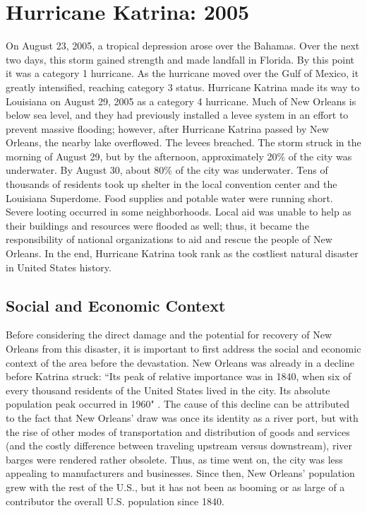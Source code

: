 \documentclass[%
 reprint,
 amsmath,amssymb,
 aps,
]{revtex4-1}
\begin{document}
\section{\label{sec:level1}Hurricane Katrina: 2005}

On August 23, 2005, a tropical depression arose over the Bahamas. Over the next two days, this storm gained strength and made landfall in Florida. By this point it was a category 1 hurricane. As the hurricane moved over the Gulf of Mexico, it greatly intensified, reaching category 3 status. Hurricane Katrina made its way to Louisiana on August 29, 2005 as a category 4 hurricane. Much of New Orleans is below sea level, and they had previously installed a levee system in an effort to prevent massive flooding; however, after Hurricane Katrina passed by New Orleans, the nearby lake overflowed. The levees breached. The storm struck in the morning of August 29, but by the afternoon, approximately 20\% of the city was underwater. By August 30, about 80\% of the city was underwater. Tens of thousands of residents took up shelter in the local convention center and the Louisiana Superdome. Food supplies and potable water were running short. Severe looting occurred in some neighborhoods. Local aid was unable to help as their buildings and resources were flooded as well; thus, it became the responsibility of national organizations to aid and rescue the people of New Orleans. In the end, Hurricane Katrina took rank as the costliest natural disaster in United States history. \cite{Katrina_encyclopedia}

\subsection{\label{sec:level2} Social and Economic Context}

Before considering the direct damage and the potential for recovery of New Orleans from this disaster, it is important to first address the social and economic context of the area before the devastation. New Orleans was already in a decline before Katrina struck:  ``Its peak of relative importance was in 1840, when six of every thousand residents of the United States lived in the city. Its absolute population peak occurred in 1960" \cite{VigdorPaper}. The cause of this decline can be attributed to the fact that New Orleans' draw was once its identity as a river port, but with the rise of other modes of transportation and distribution of goods and services (and the costly difference between traveling upstream versus downstream), river barges were rendered rather obsolete. Thus, as time went on, the city was less appealing to manufacturers and businesses. Since then, New Orleans' population grew with the rest of the U.S., but it has not been as booming or as large of a contributor the overall U.S. population since 1840. \cite{VigdorPaper}
\end{document}
